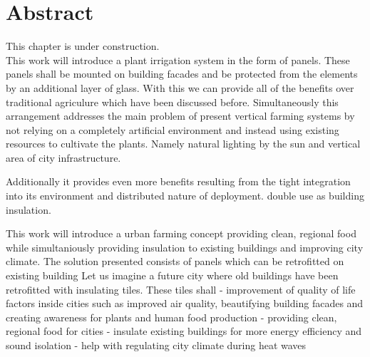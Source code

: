\chapter{Abstract}
%
This chapter is under construction.\\
This work will introduce a plant irrigation system in the form of panels.
These panels shall be mounted on building facades and be protected from the elements by an additional layer of glass.
With this we can provide all of the benefits over traditional agriculure which have been discussed before.
Simultaneously this arrangement addresses the main problem of present vertical farming systems by not relying on a completely artificial environment and instead using existing resources to cultivate the plants.
Namely natural lighting by the sun and vertical area of city infrastructure.

Additionally it provides even more benefits resulting from the tight integration into its environment and distributed nature of deployment.
double use as building insulation.

This work will introduce a urban farming concept providing clean, regional food while simultaniously providing insulation to existing buildings and improving city climate.
The solution presented consists of panels which can be retrofitted on existing building
Let us imagine a future city where old buildings have been retrofitted with insulating tiles. These tiles shall 
- improvement of quality of life factors inside cities such as improved air quality, beautifying building facades and creating awareness for plants and human food production
- providing clean, regional food for cities
- insulate existing buildings for more energy efficiency and sound isolation
- help with regulating city climate during heat waves
